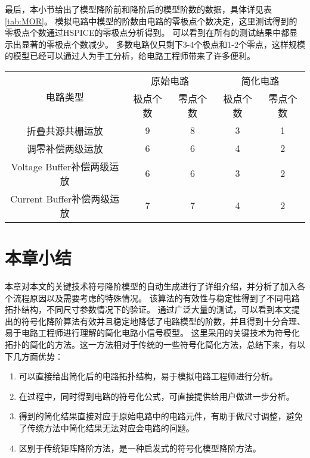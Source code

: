 最后，本小节给出了模型降阶前和降阶后的模型阶数的数据，具体详见表\ref{tab:MOR}。
模拟电路中模型的阶数由电路的零极点个数决定，这里测试得到的零极点个数通过HSPICE的零极点分析得到。
可以看到在所有的测试结果中都显示出显著的零极点个数减少。
多数电路仅只剩下3-4个极点和1-2个零点，这样规模的模型已经可以通过人为手工分析，给电路工程师带来了许多便利。

\begin{table}[!htbp]
	\centering
	\begin{tabular}{c|c|c|c|c}
		\hline
		\multirow{2}{*}{电路类型} & \multicolumn{2}{c|}{原始电路} & \multicolumn{2}{c}{简化电路} \\ \cline{2-5}
		                      & 极点个数 &        零点个数        & 极点个数 &       零点个数        \\ \hline
		      折叠共源共栅运放        &  9   &         8          &  3   &         1         \\
		      调零补偿两级运放        &  6   &         6          &  4   &         2         \\
		Voltage Buffer补偿两级运放  &  6   &         6          &  3   &         2         \\
		Current Buffer补偿两级运放  &  7   &         7          &  4   &         2         \\ \hline
	\end{tabular}
\end{table}

\section{本章小结}
\label{sec:simp:con}

本章对本文的关键技术符号降阶模型的自动生成进行了详细介绍，并分析了加入各个流程原因以及需要考虑的特殊情况。
该算法的有效性与稳定性得到了不同电路拓扑结构，不同尺寸参数情况下的验证。
通过广泛大量的测试，可以看到本文提出的符号化降阶算法有效并且稳定地降低了电路模型的阶数，并且得到十分合理、易于电路工程师进行理解的简化电路小信号模型。
这里采用的关键技术为符号化拓扑的简化的方法。这一方法相对于传统的一些符号化简化方法，总结下来，有以下几方面优势：

\begin{enumerate}[label=\emph{\alph*})]
	\item 可以直接给出简化后的电路拓扑结构，易于模拟电路工程师进行分析。
	\item 在过程中，同时得到电路的符号化公式，可直接提供给用户做进一步分析。
	\item 得到的简化结果直接对应于原始电路中的电路元件，有助于做尺寸调整，避免了传统方法中简化结果无法对应会电路的问题。
	\item 区别于传统矩阵降阶方法，是一种启发式的符号化模型降阶方法。
\end{enumerate}